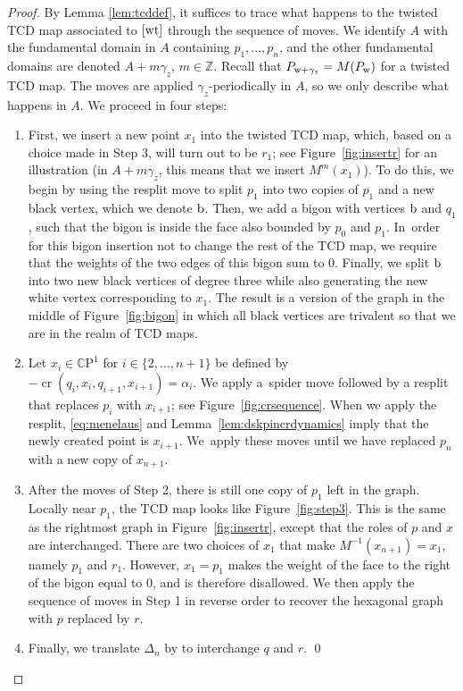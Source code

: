 \documentclass[10pt,a4paper]{amsart}
\numberwithin{equation}{section}
\newcommand{\Z}{{\mathbb Z}}
\newcommand{\CP}{{\mathbb C\mathrm P}}
\newcommand{\A}{{\mathbb A}}
\newcommand{\w}{{\rm w}}
\newcommand{\bw}{{\rm b}}
\newcommand{\wt}{{\rm wt}}
\def\cro{\operatorname{cr}}
\def\A{A}
\def\widehat#1{#1}
\begin{document}
\begin{proof}
By Lemma \ref{lem:tcddef}, it suffices to trace what happens to the twisted TCD map associated to $[\wt]$ through the sequence of moves. We identify $\A$ with the fundamental domain in $\widehat \A$ containing $p_1,\dots,p_n$, and the other fundamental domains are denoted $\A+ m \gamma_z$, $m \in \Z$. Recall that $P_{\w+\gamma_z}=M(P_\w)$ for a twisted TCD map. The moves are applied $\gamma_z$-periodically in $\widehat \A$, so we only describe what happens in $\A$. We proceed in four steps:
\begin{enumerate}\itemsep=0pt
			\item %
First, we insert a new point $x_1$ into the twisted TCD map, which, based on a choice made in Step 3, will turn out to be $r_1$; see Figure~\ref{fig:insertr} for an illustration (in $\A + m \gamma_z$, this means that we insert $M^m(x_1)$). To do this, we begin by using the resplit move to split $p_1$ into two copies of $p_1$ and a new black vertex, which we denote $\bw$. Then, we add a bigon with vertices $\bw$ and $q_1$, such that the bigon is inside the face also bounded by $p_0$ and $p_1$. In~order for this bigon insertion not to change the rest of the TCD map, we require that the weights of the two edges of this bigon sum to $0$. Finally, we split $\bw$ into two new black vertices of degree three while also generating the new white vertex corresponding to $x_1$. The result is a version of the graph in the middle of Figure~\ref{fig:bigon} in which all black vertices are trivalent so that we are in the realm of TCD maps.
			\item %
Let $x_i \in \CP^1$ for $i \in \{2,\dots,n+1\}$ be defined by $-\cro(q_i,x_i,q_{i+1},x_{i+1})=\alpha_i$.
			We apply a~spider move followed by a resplit that replaces $p_i$ with $x_{i+1}$; see Figure~\ref{fig:crsequence}. When we apply the resplit, \eqref{eq:menelaus} and Lemma~\ref{lem:dskpincrdynamics} imply that the newly created point is $x_{i+1}$. We~apply these moves until we have replaced $p_n$ with a new copy of $x_{n+1}$.
			\item %
After the moves of Step 2,
there is still one copy of $p_1$ left in the graph. Locally near $p_1$, the TCD map looks like Figure~\ref{fig:step3}. This is the same as the rightmost graph in Figure~\ref{fig:insertr}, except that the roles of $p$ and $x$ are interchanged. There are two choices of $x_1$ that make $M^{-1} (x_{n+1})=x_1$, namely $p_1$ and $r_1$. However, $x_1=p_1$ makes the weight of the face to the right of the bigon equal to $0$, and is therefore disallowed. We then apply the sequence of moves in Step 1 in reverse order to recover the hexagonal graph with $p$ replaced by $r$. 		
			
			\item Finally, we translate $\Delta_n$ by  to interchange $q$ and $r$.
\hfill\qed
\end{enumerate}
\renewcommand{\qed}{}
\end{proof}
	
\end{document}
